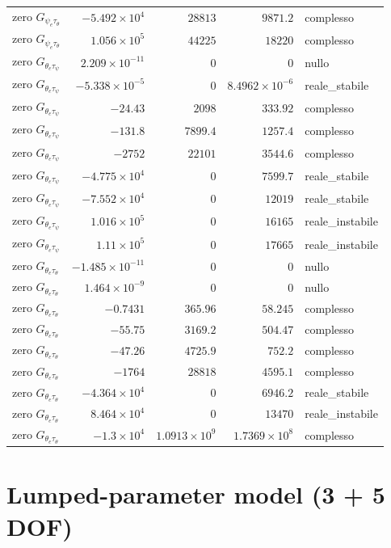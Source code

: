 \documentclass[10pt,a4paper]{article}
\numberwithin{equation}{section}
\begin{document}
\begin{longtable}{lrrrl}
zero $G_{\psi_e\tau_\theta}$ & $-5.492\times10^{4}$ & $28813$ & $9871.2$ & complesso \\
zero $G_{\psi_e\tau_\theta}$ & $1.056\times10^{5}$ & $44225$ & $18220$ & complesso \\
\midrule
zero $G_{\theta_e\tau_\psi}$ & $2.209\times10^{-11}$ & $0$ & $0$ & nullo \\
zero $G_{\theta_e\tau_\psi}$ & $-5.338\times10^{-5}$ & $0$ & $8.4962\times10^{-6}$ & reale\_stabile \\
zero $G_{\theta_e\tau_\psi}$ & $-24.43$ & $2098$ & $333.92$ & complesso \\
zero $G_{\theta_e\tau_\psi}$ & $-131.8$ & $7899.4$ & $1257.4$ & complesso \\
zero $G_{\theta_e\tau_\psi}$ & $-2752$ & $22101$ & $3544.6$ & complesso \\
zero $G_{\theta_e\tau_\psi}$ & $-4.775\times10^{4}$ & $0$ & $7599.7$ & reale\_stabile \\
zero $G_{\theta_e\tau_\psi}$ & $-7.552\times10^{4}$ & $0$ & $12019$ & reale\_stabile \\
zero $G_{\theta_e\tau_\psi}$ & $1.016\times10^{5}$ & $0$ & $16165$ & reale\_instabile \\
zero $G_{\theta_e\tau_\psi}$ & $1.11\times10^{5}$ & $0$ & $17665$ & reale\_instabile \\
\midrule
zero $G_{\theta_e\tau_\theta}$ & $-1.485\times10^{-11}$ & $0$ & $0$ & nullo \\
zero $G_{\theta_e\tau_\theta}$ & $1.464\times10^{-9}$ & $0$ & $0$ & nullo \\
zero $G_{\theta_e\tau_\theta}$ & $-0.7431$ & $365.96$ & $58.245$ & complesso \\
zero $G_{\theta_e\tau_\theta}$ & $-55.75$ & $3169.2$ & $504.47$ & complesso \\
zero $G_{\theta_e\tau_\theta}$ & $-47.26$ & $4725.9$ & $752.2$ & complesso \\
zero $G_{\theta_e\tau_\theta}$ & $-1764$ & $28818$ & $4595.1$ & complesso \\
zero $G_{\theta_e\tau_\theta}$ & $-4.364\times10^{4}$ & $0$ & $6946.2$ & reale\_stabile \\
zero $G_{\theta_e\tau_\theta}$ & $8.464\times10^{4}$ & $0$ & $13470$ & reale\_instabile \\
zero $G_{\theta_e\tau_\theta}$ & $-1.3\times10^{4}$ & $1.0913\times10^{9}$ & $1.7369\times10^{8}$ & complesso \\
\bottomrule\end{longtable}
\section{Lumped-parameter model (3 + 5 DOF)}\label{sec:lumped}
\end{document}
